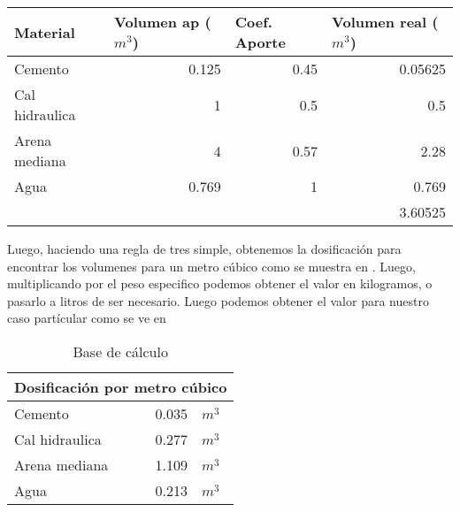\documentclass[../main.tex]{subfiles}
\begin{document}
\begin{table}[htbp]
  \centering
    \begin{tabular}{rrr|r|}
    \hline
    \multicolumn{1}{|l|}{Material} & \multicolumn{1}{l|}{Volumen ap ($m^3$)} & \multicolumn{1}{l|}{Coef. Aporte} & \multicolumn{1}{l|}{Volumen real ($m^3$)} \bigstrut\\
    \hline
    \multicolumn{1}{|l|}{Cemento} & \multicolumn{1}{r|}{0.125} & 0.45  & 0.05625 \bigstrut\\
    \hline
    \multicolumn{1}{|l|}{Cal hidraulica} & \multicolumn{1}{r|}{1} & 0.5   & 0.5 \bigstrut\\
    \hline
    \multicolumn{1}{|l|}{Arena mediana} & \multicolumn{1}{r|}{4} & 0.57  & 2.28 \bigstrut\\
    \hline
    \multicolumn{1}{|l|}{Agua} & \multicolumn{1}{r|}{0.769} & 1     & 0.769 \bigstrut\\
    \hline
          &       &       & 3.60525 \bigstrut\\
\cline{4-4}    \end{tabular}%
\end{table}%

Luego, haciendo una regla de tres simple, obtenemos la dosificación para encontrar
los volumenes para un metro cúbico como se muestra en . 
Luego, multiplicando por el peso especifico podemos obtener el valor en 
kilogramos, o pasarlo a litros de ser necesario. Luego podemos obtener el valor
para nuestro caso partícular como se ve en 

\begin{table}[ht]
  \centering
  \caption{Base de cálculo}
    \begin{tabular}{|l|rl|}
    \hline
    \multicolumn{3}{|c|}{Dosificación por metro cúbico} \bigstrut\\
    \hline
    Cemento & 0.035 & $m^3$ \bigstrut\\
\cline{1-1}    Cal hidraulica & 0.277 & $m^3$ \bigstrut\\
\cline{1-1}    Arena mediana & 1.109 & $m^3$ \bigstrut\\
\cline{1-1}    Agua  & 0.213 & $m^3$ \bigstrut\\
    \hline
    \end{tabular}%
  \label{tab:tablaprimaria}%
\end{table}%
\end{document}
